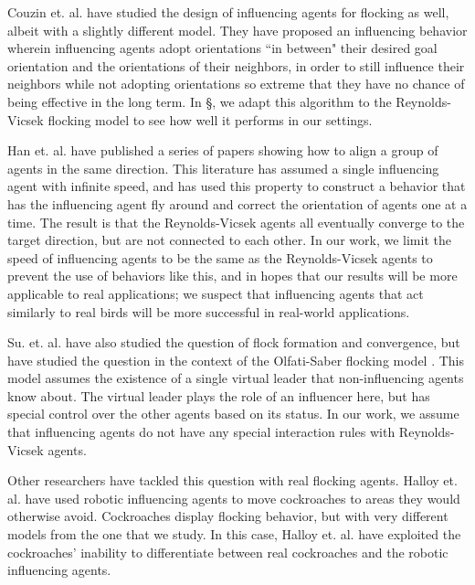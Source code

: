 Couzin et. al. \cite{couzin2005} have studied the design of influencing agents
for flocking as well, albeit with a slightly different model.
They have proposed an influencing behavior wherein influencing agents adopt
orientations ``in between" their desired goal orientation and the orientations
of their neighbors, in order to still influence their neighbors while not
adopting orientations so extreme that they have no chance of being effective in
the long term.
In \S\label{ch:influencing}, we adapt this algorithm to the Reynolds-Vicsek
flocking model to see how well it performs in our settings.

Han et. al. have \cite{han2010teleporting} published a series of papers showing
how to align a group of agents in the same direction.
This literature has assumed a single influencing agent with infinite speed, and
has used this property to construct a behavior that has the influencing agent
fly around and correct the orientation of agents one at a time.
The result is that the Reynolds-Vicsek agents all eventually converge to the
target direction, but are not connected to each other.
In our work, we limit the speed of influencing agents to be the same as the
Reynolds-Vicsek agents to prevent the use of behaviors like this, and in hopes
that our results will be more applicable to real applications; we suspect that
influencing agents that act similarly to real birds will be more successful in
real-world applications.

Su. et. al. \cite{su2009virtualleaderinformed} have also studied the question
of flock formation and convergence, but have studied the question in the
context of the Olfati-Saber flocking model
\cite{olfati2006virtualleaderinformed}.
This model assumes the existence of a single virtual leader that
non-influencing agents know about.
The virtual leader plays the role of an influencer here, but has special
control over the other agents based on its status.
In our work, we assume that influencing agents do not have any special
interaction rules with Reynolds-Vicsek agents.

Other researchers have tackled this question with real flocking agents.
Halloy et. al. \cite{Halloy2007} have used robotic influencing agents to move
cockroaches to areas they would otherwise avoid.
Cockroaches display flocking behavior, but with very different models from the
one that we study.
In this case, Halloy et. al. have exploited the cockroaches' inability to
differentiate between real cockroaches and the robotic influencing agents.

